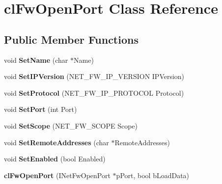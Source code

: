 \hypertarget{classcl_fw_open_port}{
\section{clFwOpenPort Class Reference}
\label{classcl_fw_open_port}
}
\subsection*{Public Member Functions}
\begin{DoxyCompactItemize}
\item 
\hypertarget{classcl_fw_open_port_aa087eaf171ec36df0d2dea2d43b46455}{
void {\bfseries SetName} (char $\ast$Name)}
\label{classcl_fw_open_port_aa087eaf171ec36df0d2dea2d43b46455}

\item 
\hypertarget{classcl_fw_open_port_ae05ab2201e64427ee8e7261d69f7d970}{
void {\bfseries SetIPVersion} (NET\_\-FW\_\-IP\_\-VERSION IPVersion)}
\label{classcl_fw_open_port_ae05ab2201e64427ee8e7261d69f7d970}

\item 
\hypertarget{classcl_fw_open_port_a128ac28129b1e6423ba935fd39c108b3}{
void {\bfseries SetProtocol} (NET\_\-FW\_\-IP\_\-PROTOCOL Protocol)}
\label{classcl_fw_open_port_a128ac28129b1e6423ba935fd39c108b3}

\item 
\hypertarget{classcl_fw_open_port_a847aeeeaa70c61b1bc2c5471459a40fb}{
void {\bfseries SetPort} (int Port)}
\label{classcl_fw_open_port_a847aeeeaa70c61b1bc2c5471459a40fb}

\item 
\hypertarget{classcl_fw_open_port_afcc53a5fc3358a22cd106683ef09bd6d}{
void {\bfseries SetScope} (NET\_\-FW\_\-SCOPE Scope)}
\label{classcl_fw_open_port_afcc53a5fc3358a22cd106683ef09bd6d}

\item 
\hypertarget{classcl_fw_open_port_a42232bf1949ac1d6984b708033f6a374}{
void {\bfseries SetRemoteAddresses} (char $\ast$RemoteAddresses)}
\label{classcl_fw_open_port_a42232bf1949ac1d6984b708033f6a374}

\item 
\hypertarget{classcl_fw_open_port_a4cbce9c38f665adaa970f1ca1a26312e}{
void {\bfseries SetEnabled} (bool Enabled)}
\label{classcl_fw_open_port_a4cbce9c38f665adaa970f1ca1a26312e}

\item 
\hypertarget{classcl_fw_open_port_a6c556a379a3e783a544648895ea3590a}{
{\bfseries clFwOpenPort} (INetFwOpenPort $\ast$pPort, bool bLoadData)}
\label{classcl_fw_open_port_a6c556a379a3e783a544648895ea3590a}


\end{DoxyCompactItemize}
